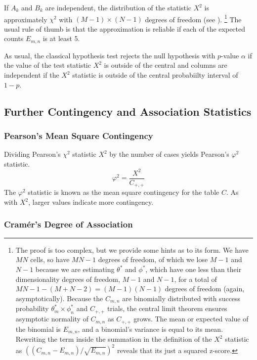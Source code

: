 If $A_k$ and $B_k$ are independent, the distribution of the statistic
$X^2$ is approximately $\chi^2$ with $(M-1) \times (N-1)$ degrees of
freedom (see ).%
%
\footnote{The proof is too complex, but we provide some hints as to
  its form.  We have $MN$ cells, so have $MN-1$ degrees of freedom, of
  which we lose $M-1$ and $N-1$ because we are estimating $\theta^*$
  and $\phi^*$, which have one less than their dimensionality degrees
  of freedom, $M-1$ and $N-1$, for a total of $MN-1 - (M + N -2) =
  (M-1)(N-1)$ degrees of freedom (again, asymptotically).  Because the
  $C_{m,n}$ are binomially distributed with success probability
  $\theta^*_m \times \phi^*_n$ and $C_{+,+}$ trials, the central limit
  theorem ensures asymptotic normality of $C_{m,n}$ as $C_{+,+}$
  grows.  The mean or expected value of the binomial is $E_{m,n}$, and
  a binomial's variance is equal to its mean.  Rewriting the term
  inside the summation in the definition of the $X^2$ statistic as
  $((C_{m,n} - E_{m,n})/\sqrt{E_{m,n}})^2$ reveals that its just a
  squared z-score.}
%
The usual rule of thumb is that the approximation is reliable if each
of the expected counts $E_{m,n}$ is at least 5.

As usual, the classical hypothesis test rejects the null hypothesis with
$p$-value $\alpha$ if the value of the test statistic $X^2$ is outside
of the central and columns are independent if the $X^2$ statistic is
outside of the central probabiilty interval of $1-p$.

\subsection{Further Contingency and Association Statistics}\label{section:classifier-eval-further-assoc}

\subsubsection{Pearson's Mean Square Contingency}

Dividing Pearson's $\chi^2$ statistic $X^2$ by the number of cases
yields Pearson's $\varphi^2$ statistic.
%
\begin{equation}
\varphi^2 =\frac{X^2}{C_{+,+}}
\end{equation}
%
The $\varphi^2$ statistic is known as the mean square contingency for
the table $C$.  As with $X^2$, larger values indicate more contingency.

\subsubsection{Cramér's Degree of Association}

